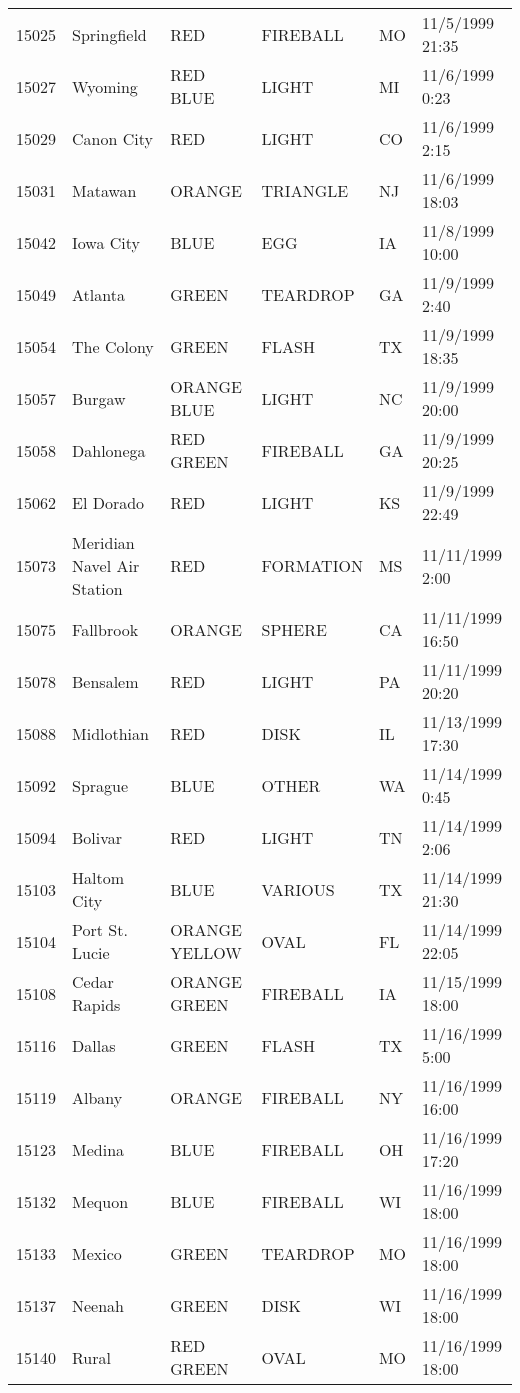 \begin{tabular}{llllll}
15025 & Springfield & RED & FIREBALL & MO & 11/5/1999 21:35 \\
15027 & Wyoming & RED BLUE & LIGHT & MI & 11/6/1999 0:23 \\
15029 & Canon City & RED & LIGHT & CO & 11/6/1999 2:15 \\
15031 & Matawan & ORANGE & TRIANGLE & NJ & 11/6/1999 18:03 \\
15042 & Iowa City & BLUE & EGG & IA & 11/8/1999 10:00 \\
15049 & Atlanta & GREEN & TEARDROP & GA & 11/9/1999 2:40 \\
15054 & The Colony & GREEN & FLASH & TX & 11/9/1999 18:35 \\
15057 & Burgaw & ORANGE BLUE & LIGHT & NC & 11/9/1999 20:00 \\
15058 & Dahlonega & RED GREEN & FIREBALL & GA & 11/9/1999 20:25 \\
15062 & El Dorado & RED & LIGHT & KS & 11/9/1999 22:49 \\
15073 & Meridian Navel Air Station & RED & FORMATION & MS & 11/11/1999 2:00 \\
15075 & Fallbrook & ORANGE & SPHERE & CA & 11/11/1999 16:50 \\
15078 & Bensalem & RED & LIGHT & PA & 11/11/1999 20:20 \\
15088 & Midlothian & RED & DISK & IL & 11/13/1999 17:30 \\
15092 & Sprague & BLUE & OTHER & WA & 11/14/1999 0:45 \\
15094 & Bolivar & RED & LIGHT & TN & 11/14/1999 2:06 \\
15103 & Haltom City & BLUE & VARIOUS & TX & 11/14/1999 21:30 \\
15104 & Port St. Lucie & ORANGE YELLOW & OVAL & FL & 11/14/1999 22:05 \\
15108 & Cedar Rapids & ORANGE GREEN & FIREBALL & IA & 11/15/1999 18:00 \\
15116 & Dallas & GREEN & FLASH & TX & 11/16/1999 5:00 \\
15119 & Albany & ORANGE & FIREBALL & NY & 11/16/1999 16:00 \\
15123 & Medina & BLUE & FIREBALL & OH & 11/16/1999 17:20 \\
15132 & Mequon & BLUE & FIREBALL & WI & 11/16/1999 18:00 \\
15133 & Mexico & GREEN & TEARDROP & MO & 11/16/1999 18:00 \\
15137 & Neenah & GREEN & DISK & WI & 11/16/1999 18:00 \\
15140 & Rural & RED GREEN & OVAL & MO & 11/16/1999 18:00 \\

\end{tabular}
